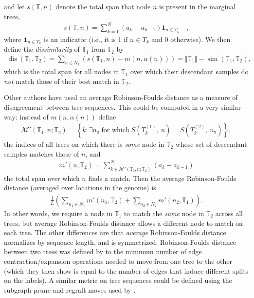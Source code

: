 \documentclass[10pt,twoside,lineno]{gsajnl}
\newcommand{\T}{\mathbb{T}}
\newcommand{\ind}{\mathbf{1}}
\newcommand{\dis}{\operatorname{dis}}
\newcommand{\similarity}{\operatorname{sim}}
\begin{document}
and let $s(\T,n)$ denote
the total span that node $n$ is present in the marginal trees,
\begin{align*}
    s(\T, n) = \sum_{k=1}^N (a_k - a_{k-1}) \ind_{n \in T_k} \quad ,
\end{align*}
where $\ind_{n \in T_k}$ is an indicator (i.e., it is 1 if $n \in T_k$ and 0 otherwise).
We then define the \emph{dissimilarity} of $\T_1$ from $\T_2$ by
\begin{align*}
    \dis(\T_1, \T_2)
    =
    \sum_{n \in N_1} (s(\T_1, n) - m(n, \alpha(n))) 
    = 
    \Vert \T_1\Vert -\similarity(\T_1,\T_2),
\end{align*}
which is the total span for all nodes in $\T_1$
over which their descendant samples do \emph{not} match those of their best match in $\T_2$.

Other authors \citep[e.g.,][]{kelleher2019inferring} have used
an average Robinson-Foulds distance \citep{robinson1981comparison}
as a measure of disagreement between tree sequences.
This could be computed in a very similar way:
instead of $m(n, \alpha(n))$ define
\begin{align*}
    \mathcal{M}'(\T_1, n; \T_2) = \left\{ k : \exists n_2  \;\text{for which}\; S\left(T^{(1)}_k,\ n\right) = S\left(T^{(2)}_k,\ n_2\right) \right\},
\end{align*}
the indices of all trees on which there is \emph{some} node in $\T_2$
whose set of descendant samples matches those of $n$, and
\begin{align*}
    m'(n, \T_2) = \sum_{k \in \mathcal{M}'(\T_1, n; \T_2)}^N (a_k - a_{k-1})
\end{align*}
the total span over which $n$ finds a match.
Then the average Robinson-Foulds distance (averaged over locations in the genome)
is
\begin{align*}
    \frac{1}{L} \left( \sum_{n_1 \in N_1} m'(n_1, \T_2)  + \sum_{n_2 \in N_2} m'(n_2, \T_1) \right).
\end{align*}
In other words, we require a node in $\T_1$ to match the \emph{same} node in $\T_2$
across all trees, but average Robinson-Foulds distance allows a different node to match
on each tree.
The other differences are that \emph{average} Robinson-Foulds distance
normalizes by sequence length, and is symmetrized.
Robinson-Foulds distance between two trees
was defined by \citet{robinson1981comparison}
to the minimum number of edge contraction/expansion operations needed to move
from one tree to the other
(which they then show is equal to the number of edges that induce different splits on the labels).
A similar metric on tree sequences could be defined
using the subgraph-prune-and-regraft moves used by \citet{deng2024robust}.
\end{document}
